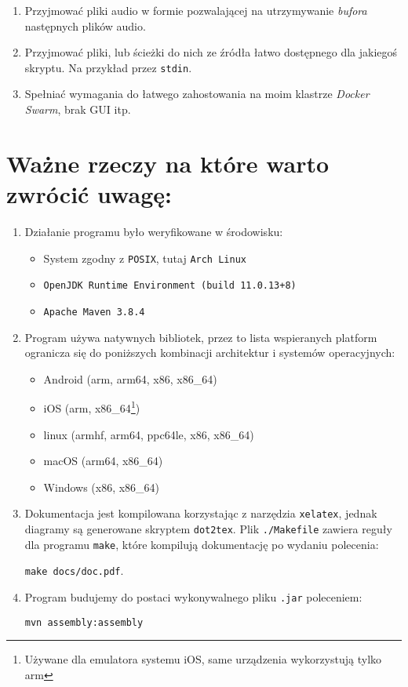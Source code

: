 \documentclass[a4paper,12pt]{article}
\begin{document}
\begin{enumerate}
        \item Przyjmować pliki audio w formie pozwalającej na utrzymywanie
            \emph{bufora} następnych plików audio.
        \item Przyjmować pliki, lub ścieżki do nich ze źródła łatwo dostępnego 
            dla jakiegoś skryptu. Na przykład przez \texttt{stdin}.
        \item Spełniać wymagania do łatwego zahostowania na moim klastrze
            \emph{Docker Swarm}, brak GUI itp.
\end{enumerate}

\section*{Ważne rzeczy na które warto zwrócić uwagę:}

\begin{enumerate}
    \item Działanie programu było weryfikowane w środowisku: 
        \begin{itemize}
            \item System zgodny z \texttt{POSIX}, tutaj \texttt{Arch Linux}
            \item \texttt{OpenJDK Runtime Environment (build 11.0.13+8)}
            \item \texttt{Apache Maven 3.8.4}
        \end{itemize}
    \item Program używa natywnych bibliotek, przez to lista wspieranych platform
        ogranicza się do poniższych kombinacji architektur i systemów
        operacyjnych: 
        \begin{itemize}
            \item Android (arm, arm64, x86, x86\_64)
            \item iOS (arm, x86\_64\footnote{Używane dla emulatora systemu iOS,
                same urządzenia wykorzystują tylko arm})
            \item linux (armhf, arm64, ppc64le, x86, x86\_64)
            \item macOS (arm64, x86\_64)
            \item Windows (x86, x86\_64)
        \end{itemize}
    \item Dokumentacja jest kompilowana korzystając z narzędzia
        \texttt{xelatex}, jednak diagramy są generowane skryptem
        \texttt{dot2tex}. Plik \texttt{./Makefile} zawiera reguły dla programu
        \texttt{make}, które kompilują dokumentację po wydaniu polecenia:
        \begin{center}
            \texttt{make docs/doc.pdf}.
        \end{center}
    \item Program budujemy do postaci wykonywalnego pliku \texttt{.jar}
        poleceniem:
        \begin{center}
            \texttt{mvn assembly:assembly}
        \end{center}
\end{enumerate}
\end{document}
